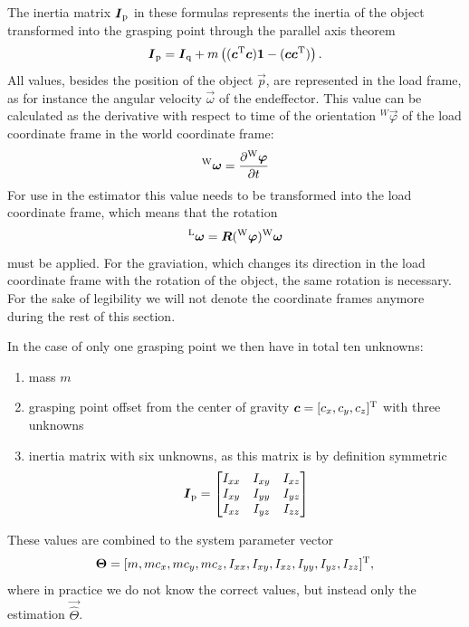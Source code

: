 The inertia matrix $\boldsymbol{I}_{\mathrm{p}}$ in these formulas represents the inertia of the object transformed into the grasping point through the parallel axis theorem
\begin{equation}
	\boldsymbol{I}_{\mathrm{p}} = \boldsymbol{I}_{\mathrm{q}} + m \left( (\boldsymbol{c}^{\mathrm{T}} \boldsymbol{c}) \boldsymbol{1} - (\boldsymbol{c} \boldsymbol{c}^{\mathrm{T}}) \right).
\end{equation}
All values, besides the position of the object $\vec p$, are represented in the load frame, as for instance the angular velocity $\vec \omega$ of the endeffector. This value can be calculated as the derivative with respect to time of the orientation $^W\vec{\varphi}$ of the load coordinate frame in the world coordinate frame:
\begin{equation}
	{^{\mathrm{W}}}\boldsymbol{\omega} = \frac{\partial {^{\mathrm{W}}}\boldsymbol{\varphi}}{\partial t}
\end{equation}
For use in the estimator this value needs to be transformed into the load coordinate frame, which means that the rotation
\begin{equation}
	^{\mathrm{L}}\boldsymbol{\omega} = \boldsymbol{R}({^{\mathrm{W}}}\boldsymbol{\varphi}) {^{\mathrm{W}}}\boldsymbol{\omega}
\end{equation}
must be applied. For the graviation, which changes its direction in the load coordinate frame with the rotation of the object, the same rotation is necessary. For the sake of legibility we will not denote the coordinate frames anymore during the rest of this section.

In the case of only one grasping point we then have in total ten unknowns:
\begin{enumerate}
	\item mass $m$
	\item grasping point offset from the center of gravity $\boldsymbol{c} = [c_x, c_y, c_z]^{\mathrm{T}}$ with three unknowns
	\item inertia matrix with six unknowns, as this matrix is by definition symmetric
	\begin{equation}
		\boldsymbol{I}_{\mathrm{p}} = 
		\begin{bmatrix}	
			I_{xx}	& I_{xy}	& I_{xz} \\
			I_{xy}	& I_{yy}	& I_{yz} \\
			I_{xz}	& I_{yz}	& I_{zz}
		\end{bmatrix}
	\end{equation}
\end{enumerate}

These values are combined to the system parameter vector
\begin{equation}
	\boldsymbol{\Theta} = [m, m c_x, m c_y, m c_z, I_{xx}, I_{xy}, I_{xz}, I_{yy},I_{yz}, I_{zz}]^{\mathrm{T}},
\end{equation}
where in practice we do not know the correct values, but instead only the estimation $\vec{\hat \Theta}$.

